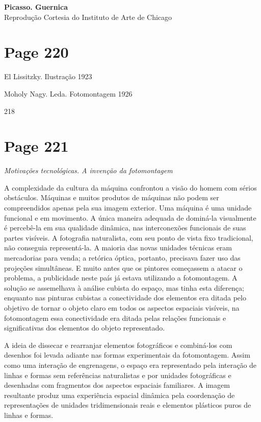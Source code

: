 \documentclass[a4paper]{article}
\begin{document}
\noindent \textbf{Picasso. Guernica}\\
Reprodução Cortesia do Instituto de Arte de Chicago

\newpage
\section*{Page 220}

El Lissitzky. Ilustração 1923

Moholy Nagy. Leda. Fotomontagem 1926

218

\newpage
\section*{Page 221}

\normalfont\itshape Motivações tecnológicas. A invenção da fotomontagem\par
\vspace{\baselineskip} %

A complexidade da cultura da máquina confrontou a visão do homem com sérios obstáculos. Máquinas e muitos produtos de máquinas não podem ser compreendidos apenas pela sua imagem exterior. Uma máquina é uma unidade funcional e em movimento. A única maneira adequada de dominá-la visualmente é percebê-la em sua qualidade dinâmica, nas interconexões funcionais de suas partes visíveis. A fotografia naturalista, com seu ponto de vista fixo tradicional, não conseguia representá-la. A maioria das novas unidades técnicas eram mercadorias para venda; a retórica óptica, portanto, precisava fazer uso das projeções simultâneas. E muito antes que os pintores começassem a atacar o problema, a publicidade neste país já estava utilizando a fotomontagem. A solução se assemelhava à análise cubista do espaço, mas tinha esta diferença; enquanto nas pinturas cubistas a conectividade dos elementos era ditada pelo objetivo de tornar o objeto claro em todos os aspectos espaciais visíveis, na fotomontagem essa conectividade era ditada pelas relações funcionais e significativas dos elementos do objeto representado.

\par
A ideia de dissecar e rearranjar elementos fotográficos e combiná-los com desenhos foi levada adiante nas formas experimentais da fotomontagem. Assim como uma interação de engrenagens, o espaço era representado pela interação de linhas e formas sem referências naturalistas e por unidades fotográficas e desenhadas com fragmentos dos aspectos espaciais familiares. A imagem resultante produz uma experiência espacial dinâmica pela coordenação de representações de unidades tridimensionais reais e elementos plásticos puros de linhas e formas.
\end{document}
